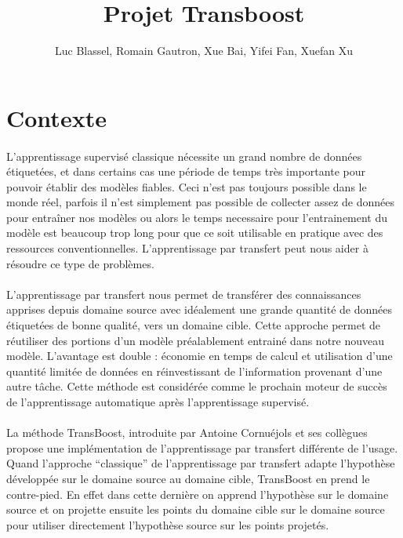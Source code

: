 \documentclass[11 pt]{article}
\title{Projet Transboost}
\author{Luc Blassel, Romain Gautron, Xue Bai, Yifei Fan, Xuefan Xu}
\begin{document}
\maketitle

\tableofcontents
\newpage

\section{Contexte}
\paragraph{}L’apprentissage supervisé  classique nécessite un grand nombre de données étiquetées, et dans certains cas une période de temps très importante pour pouvoir établir des modèles fiables. Ceci n’est pas toujours possible dans le monde réel, parfois il n’est simplement pas possible de collecter assez de données pour entraîner nos modèles ou alors le temps necessaire pour l’entrainement du modèle est beaucoup trop long pour que ce soit utilisable en pratique avec des ressources conventionnelles. L’apprentissage par transfert peut nous aider à résoudre ce type de problèmes.

\paragraph{}L’apprentissage par transfert nous permet de transférer des connaissances apprises depuis domaine source avec idéalement une grande quantité de données étiquetées de bonne qualité, vers un domaine cible. Cette approche permet de réutiliser des portions d’un modèle préalablement entrainé dans notre nouveau modèle. L'avantage est double : économie en temps de calcul et utilisation d'une quantité limitée de données en réinvestissant de l'information provenant d'une autre tâche. Cette méthode est considérée comme le prochain moteur de succès de l’apprentissage automatique après l’apprentissage supervisé.

\paragraph{}La méthode TransBoost, introduite par Antoine Cornuéjols et ses collègues propose une implémentation de l’apprentissage par transfert différente de l'usage. Quand l’approche “classique” de l’apprentissage par transfert adapte l'hypothèse développée sur le domaine source au domaine cible, TransBoost en prend le contre-pied. En effet dans cette dernière on apprend l'hypothèse sur le domaine source et on projette ensuite les points du domaine cible sur le domaine source pour utiliser directement l'hypothèse source sur les points projetés. 
\end{document}

